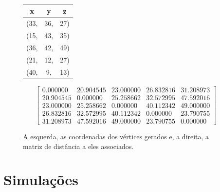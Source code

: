 \documentclass[a4paper,12pt]{report}
\begin{document}
	\begin{figure}[H]
	\begin{center}
		\begin{minipage}{0.15 \linewidth}
			\begin{table}[H]
				\centering
				\begin{tabular}{ |c c c| } 
					\hline
					\textbf{x} & \textbf{y} & \textbf{z} \\\hline
					(33, & 36, & 27)\\

					(15, & 43, & 35)\\

					(36, & 42, & 49)\\

					(21, & 12, & 27)\\

					(40, & 9, & 13)\\\hline

				\end{tabular}
				\label{tab:re1}
			\end{table}
		\end{minipage}
	\hspace{0.1cm}
		\begin{minipage}{0.8 \linewidth}
			\begin{equation*}
				\begin{bmatrix}
				 0.000000 & 20.904545 & 23.000000 & 26.832816 & 31.208973\\
	
				20.904545 & 0.000000 & 25.258662 & 32.572995 & 47.592016\\
	
				23.000000 & 25.258662 & 0.000000 & 40.112342 & 49.000000\\
	
				26.832816 & 32.572995 & 40.112342 & 0.000000 & 23.790755\\
	
				31.208973 & 47.592016 & 49.000000 & 23.790755 & 0.000000	
				\end{bmatrix}
			\end{equation*}
		\end{minipage}
	\end{center}
\caption{A esquerda, as coordenadas dos vértices gerados e, a direita, a matriz de distância a eles associados.}
\label{fig:inst}
\end{figure}
	
	\section{Simulações}
	
\end{document}
